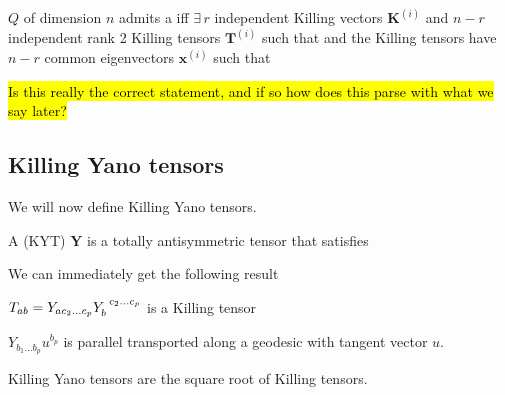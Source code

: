 \documentclass{article}
\begin{document}
\begin{theorem}[Separability]
$Q$ of dimension $n$ admits a  iff $\exists \, r$ independent Killing vectors $\bm{K}^{(i)}$ and $n-r$ independent rank 2 Killing tensors $\bm{T}^{(i)}$ such that 
and the Killing tensors have $n-r$ common eigenvectors $\bm{x}^{(i)}$ such that 
\end{theorem}

\hl{Is this really the correct statement, and if so how does this parse with what we say later?}
\subsection{Killing Yano tensors}
We will now define Killing Yano tensors.

\begin{definition}
A  (KYT) $\bm{Y}$ is a totally antisymmetric tensor that satisfies 
\end{definition}

We can immediately get the following result

\begin{prop}
$T_{ab} = Y_{ac_2 \dots c_p}Y\indices{_b^{c_2}^\dots^{c_p}}$ is a Killing tensor
\end{prop}

\begin{prop}
$Y_{b_1 \dots b_p}u^{b_p}$ is parallel transported along a geodesic with tangent vector $u$. 
\end{prop}

\begin{idea}
Killing Yano tensors are the square root of Killing tensors.
\end{idea}
\end{document}

